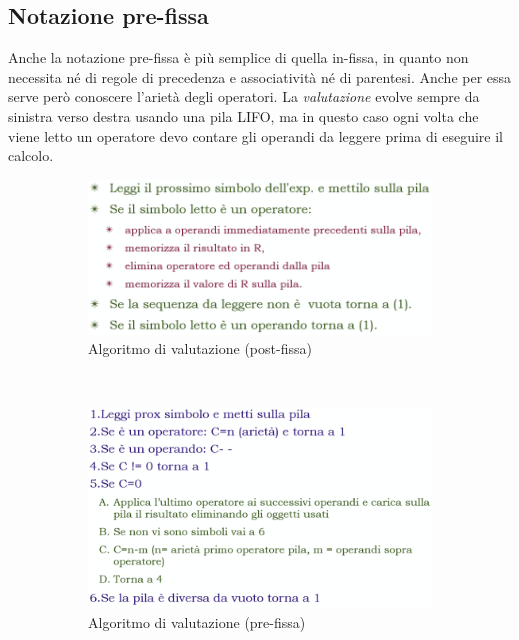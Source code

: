 \documentclass[a4paper,oneside,titlepage]{book}
\newcommand{\rulesep}{\unskip\ \vrule\ }
\begin{document}
\subsection{Notazione pre-fissa}
Anche la notazione pre-fissa è più semplice di quella in-fissa, in quanto non necessita né di regole di precedenza e associatività né di parentesi. Anche per essa serve però conoscere l'arietà degli operatori. La \textit{valutazione} evolve sempre da sinistra verso destra usando una pila LIFO, ma in questo caso ogni volta che viene letto un operatore devo contare gli operandi da leggere prima di eseguire il calcolo.
\begin{figure}[htp]
	\begin{subfigure}{0.49\textwidth}
		\includegraphics[width=\textwidth, height=\textheight, keepaspectratio]{post1.png} 
		\caption{Algoritmo di valutazione (post-fissa)}
	\end{subfigure}
	\rulesep
	\begin{subfigure}{0.49\textwidth}
		\includegraphics[width=\textwidth, height=\textheight, keepaspectratio]{pre1.png} 
		\caption{Algoritmo di valutazione (pre-fissa)}
	\end{subfigure}
	\begin{subfigure}{0.49\textwidth}

\end{subfigure}
\end{figure}
\end{document}
